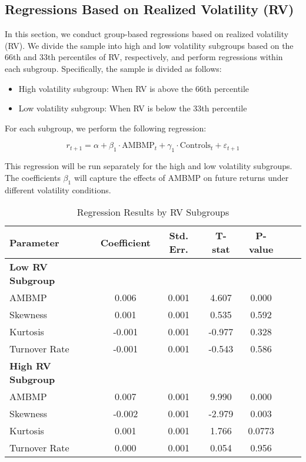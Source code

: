 \documentclass[preprint,12pt,authoryear]{elsarticle}
\begin{document}
\subsection{Regressions Based on Realized Volatility (RV)}

In this section, we conduct group-based regressions based on realized volatility (RV). We divide the sample into high and low volatility subgroups based on the 66th and 33th percentiles of RV, respectively, and perform regressions within each subgroup. Specifically, the sample is divided as follows:

\begin{itemize}
    \item High volatility subgroup: When RV is above the 66th percentile
    \item Low volatility subgroup: When RV is below the 33th percentile
\end{itemize}

For each subgroup, we perform the following regression:

\begin{equation}
r_{t+1} = \alpha + \beta_1 \cdot \mathrm{AMBMP}_t + \gamma_1 \cdot \mathrm{Controls}_t + \varepsilon_{t+1}
\end{equation}

This regression will be run separately for the high and low volatility subgroups. The coefficients $\beta_1$ will capture the effects of AMBMP on future returns under different volatility conditions.

\begin{table}[h!]
  \centering
  \caption{Regression Results by RV Subgroups}
  \label{tab:rv_subgroup_results}
  \begin{tabular}{lcccccc}
    \toprule
    \textbf{Parameter}     & \textbf{Coefficient} & \textbf{Std. Err.} & \textbf{T-stat} & \textbf{P-value} \\
    \midrule
    \textbf{Low RV Subgroup} &          &          &          &          \\
    AMBMP                  & 0.006   & 0.001   & 4.607   & 0.000   \\
    Skewness               & 0.001   & 0.001   & 0.535   & 0.592   \\
    Kurtosis               & -0.001  & 0.001   & -0.977  & 0.328   \\
    Turnover Rate          & -0.001  & 0.001   & -0.543  & 0.586   \\
    \midrule
    \textbf{High RV Subgroup} &          &          &          &          \\
    \midrule
    AMBMP                  & 0.007   & 0.001   & 9.990   & 0.000   \\
    Skewness               & -0.002  & 0.001   & -2.979  & 0.003  \\
    Kurtosis               & 0.001   & 0.001   & 1.766   & 0.0773  \\
    Turnover Rate          & 0.000   & 0.001   & 0.054   & 0.956   \\
    \bottomrule
  \end{tabular}
\end{table}
\end{document}
